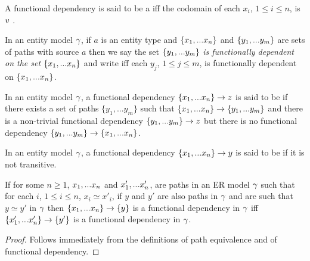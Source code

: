 \begin{definition}
A functional dependency  is said to be a  iff
 the codomain of each $x_i$, $1 \leq i \leq n$, is $v$ .
\end{definition}

\begin{definition}
In an entity model $\gamma$, if
$a$ is an entity type and $\left\{x_1,...x_n\right\}$ and $\left\{y_1,...y_m\right\}$ are sets of paths with source $a$
then we say the set $\left\{y_1,...y_m\right\}$ \textit{is functionally dependent on the set} $\left\{x_1,...x_n\right\}$ and write
iff  each $y_j$, $1 \leq j \leq m$, is functionally dependent on $\left\{x_1,...x_n\right\}$.
\end{definition}
\begin{definition} %
In an entity model $\gamma$, a functional dependency $\left\{x_1,...x_n\right\} \rightarrow z$
is said to be  if there exists a set of paths $\{y_1,...y_{m}\}$ such that
$\left\{x_1,...x_n\right\} \rightarrow \left\{y_1,...y_{m}\right\}$ and there is a non-trivial functional
dependency $\left\{y_1,...y_{m}\right\} \rightarrow z$ but there is no functional dependency 
$\{y_1,...y_{m}\} \rightarrow \{x_1,...x_n\}$.
\end{definition}
\begin{definition} %
In an entity model $\gamma$, a functional dependency $\left\{x_1,...x_n\right\} \rightarrow y$
is said to be  if it is not transitive.
\end{definition} 

\begin{lemma}
If for some $n \geq 1$, $x_1,...x_n$ and $x'_1,...x'_n$,  are paths in an ER model $\gamma$
such that for each $i$, $1 \leq i \leq n$, $x_i \simeq x'_i$,
if $y$ and $y'$ are also paths in $\gamma$ and are 
such that $y \simeq y'$ in $\gamma$ then $\left\{x_1,...x_n\right\} \rightarrow \left\{y\right\}$ is a functional dependency in $\gamma$ iff 
$\left\{x'_1,...x'_n\right\} \rightarrow \left\{y'\right\}$ is a functional dependency in $\gamma$.
\end{lemma}
\begin{proof}
Follows immediately from the definitions of path equivalence and of functional dependency.
\end{proof}


